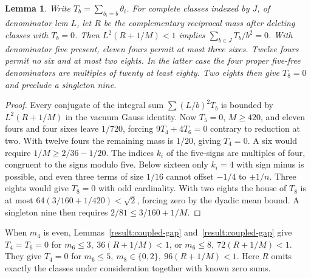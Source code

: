 \documentclass[11pt]{amsart}
\numberwithin{equation}{section}
\newtheorem{lemma}[theorem]{Lemma}
\theoremstyle{definition}
\theoremstyle{plain}
\begin{document}
\begin{lemma}\label{result:small-Gauss}
Write $T_b=\sum_{b_i=b}\theta_i$. For complete classes indexed by
$J$, of denominator lcm $L$, let $R$ be the complementary reciprocal
mass after deleting classes with $T_b=0$. Then
$L^2(R+1/M)<1$ implies $\sum_{b\in J}T_b/b^2=0$.
With denominator five present, eleven fours permit at most three
sixes. Twelve fours permit no six and at most two eights. In the
latter case the four proper five-free denominators are multiples of
twenty at least eighty. Two eights then give $T_8=0$ and preclude a
singleton nine.
\end{lemma}
\begin{proof}
Every conjugate of the integral sum $\sum(L/b)^2T_b$ is bounded by
$L^2(R+1/M)$ in the vacuum Gauss identity. Now $T_5=0$, $M\ge420$,
and eleven fours and four sixes leave $1/720$, forcing
$9T_4+4T_6=0$ contrary to reduction at two. With twelve fours the
remaining mass is $1/20$, giving $T_4=0$. A six would require
$1/M\ge2/36-1/20$. The indices $k_i$ of the five-signs are
multiples of four, congruent to the signs modulo five. Below sixteen
only $k_i=4$ with sign minus is possible, and even three terms of
size $1/16$ cannot offset $-1/4$ to $\pm1/n$. Three eights
would give $T_8=0$ with odd cardinality. With two eights the house
of $T_8$ is at most $64(3/160+1/420)<\sqrt2$, forcing zero by the
dyadic mean bound. A singleton nine then requires
$2/81\le3/160+1/M$.
\end{proof}
When $m_4$ is even, Lemmas~\ref{result:coupled-gap}
and~\ref{result:coupled-gap} give $T_4=T_6=0$ for
$m_6\le3,\ 36(R+1/M)<1$, or $m_6\le8,\ 72(R+1/M)<1$.
They give $T_4=0$ for $m_6\le5,\ m_8\in\{0,2\},\ 96(R+1/M)<1$.
Here $R$ omits exactly the classes under consideration together with
known zero sums.
\end{document}
